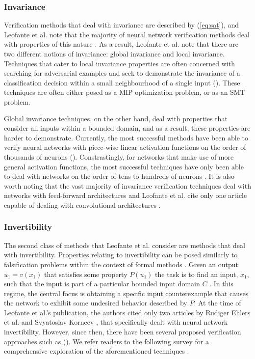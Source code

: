 \documentclass[10pt,conference]{IEEEtran}
\begin{document}
\subsubsection{Invariance}
Verification methods that deal with invariance are described by (\ref{eq:sat}), and Leofante et al. note that the majority of neural network verification methods deal with properties of this nature \cite{XiangVerification2018}. As a result, Leofante et al. note that there are two different notions of invariance: global invariance and local invariance. Techniques that cater to local invariance properties are often concerned with searching for adversarial examples and seek to demonstrate the invariance of a classification decision within a small neighbourhood of a single input (\cite{HuangSafetyVerification2016, NarodytskaVerifying2017}). These techniques are often either posed as a MIP optimization problem, or as an SMT problem. 

Global invariance techniques, on the other hand, deal with properties that consider all inputs within a bounded domain, and as a result, these properties are harder to demonstrate. Currently, the most successful methods have been able to verify neural networks with piece-wise linear activation functions on the order of thousands of neurons (\cite{KatzReluplex2017, KatzLecture_2018, BunelPiecewise2017}). Constrastingly, for networks that make use of more general activation functions, the most successful techniques have only been able to deal with networks on the order of tens to hundreds of neurons \cite{PulinaAbstraction2010}. It is also worth noting that the vast majority of invariance verification techniques deal with networks with feed-forward architectures and Leofante et al. cite only one article capable of dealing with convolutional architectures \cite{HuangSafetyVerification2016}. 
\subsubsection{Invertibility}
The second class of methods that Leofante et al. consider are methods that deal with invertibility. Properties relating to invertibility can be posed similarly to falsification problems within the context of formal methods \cite{XiangVerification2018}. Given an output $u_1=v(x_1)$ that satisfies some property $P(u_1)$ the task is to find an input, $x_1$, such that the input is part of a particular bounded input domain $C$ \cite{LeofanteAdvances2018}. In this regime, the central focus is obtaining a specific input counterexample that causes the network to exhibit some undesired behavior described by $P$. At the time of Leofante et al.'s publication, the authors cited only two articles by Rudiger Ehlers et al. \cite{EhlersFormal2018} and Svyatoslav Korneev \cite{KorneevConstrained2018}, that specifically dealt with neural network invertibility. However, since then, there have been several proposed verification approaches such as  (\cite{WickerFeatureGuided2017,DreossiSemantic2018}). We refer readers to the following survey for a comprehensive exploration of the aforementioned techniques \cite{XiangVerification2018}.
\end{document}
